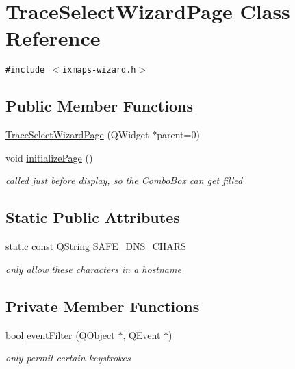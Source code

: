 \hypertarget{classTraceSelectWizardPage}{
\section{TraceSelectWizardPage Class Reference}
\label{classTraceSelectWizardPage}
}
{\tt \#include $<$ixmaps-wizard.h$>$}

\subsection*{Public Member Functions}
\begin{CompactItemize}
\item 
\hyperlink{classTraceSelectWizardPage_52bc076b279131bd43e9e80dc94eaf41}{TraceSelectWizardPage} (QWidget $\ast$parent=0)
\item 
\hypertarget{classTraceSelectWizardPage_dd7ed2d1fe53f65c94de0cab1ba506ef}{
void \hyperlink{classTraceSelectWizardPage_dd7ed2d1fe53f65c94de0cab1ba506ef}{initializePage} ()}
\label{classTraceSelectWizardPage_dd7ed2d1fe53f65c94de0cab1ba506ef}

\begin{CompactList}\small\item\em called just before display, so the ComboBox can get filled \item\end{CompactList}\end{CompactItemize}
\subsection*{Static Public Attributes}
\begin{CompactItemize}
\item 
static const QString \hyperlink{classTraceSelectWizardPage_ecea06bd0ef463ee341d1dab45b94ecf}{SAFE\_\-DNS\_\-CHARS}
\begin{CompactList}\small\item\em only allow these characters in a hostname \item\end{CompactList}\end{CompactItemize}
\subsection*{Private Member Functions}
\begin{CompactItemize}
\item 
\hypertarget{classTraceSelectWizardPage_17bf4a71d95dfd398c1541074aaa563b}{
bool \hyperlink{classTraceSelectWizardPage_17bf4a71d95dfd398c1541074aaa563b}{eventFilter} (QObject $\ast$, QEvent $\ast$)}
\label{classTraceSelectWizardPage_17bf4a71d95dfd398c1541074aaa563b}

\begin{CompactList}\small\item\em only permit certain keystrokes \item\end{CompactList}\end{CompactItemize}
